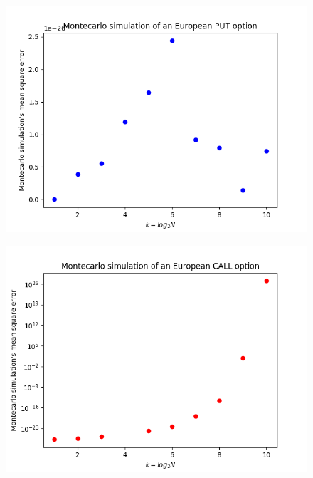 \documentclass{article}
\begin{document}
\begin{figure}[H]
	\includegraphics[width=\linewidth]{Figure_2.png}
	\centering
	
	\label{}
\end{figure}

\begin{figure}[H]
	\includegraphics[width=\linewidth]{Figure_3.png}
	\centering
	
	\label{}
\end{figure}

\end{document}
